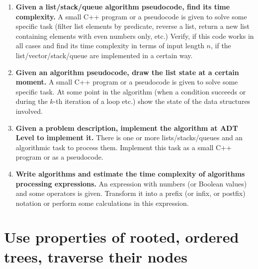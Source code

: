 \documentclass[a4paper,12pt]{article}
\begin{document}
\begin{enumerate}[label=1.\Alph*.]
\item {\bf Given a list/stack/queue algorithm pseudocode, find its time complexity.}
A small C++ program or a pseudocode is given to solve some specific task (filter list elements by predicate, 
reverse a list, return a new list containing elements with even numbers only, etc.)
Verify, if this code works in all cases and find its time complexity in terms of 
input length $n$, if the list/vector/stack/queue are implemented in a certain way.
\item {\bf Given an algorithm pseudocode, draw the list state at a certain moment.}
A small C++ program or a pseudocode is given to solve some specific task. At some point in the algorithm 
(when a condition succeeds or during the $k$-th iteration of a loop etc.) 
show the state of the data structures involved.
\item {\bf Given a problem description, implement the algorithm at ADT Level to implement it.}
There is one or more lists/stacks/queues and an algorithmic task to process them. 
Implement this task as a small C++ program or as a pseudocode.
\item {\bf Write algorithms and estimate the time complexity of algorithms processing expressions.}
An expression with numbers (or Boolean values) and some operators is given. 
Transform it into a prefix (or infix, or postfix) notation or perform some calculations in this expression.
\end{enumerate}


\section{Use properties of rooted, ordered trees, traverse their nodes}
\end{document}
